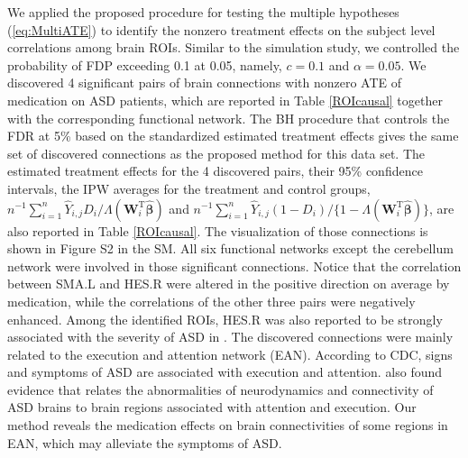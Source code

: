 \documentclass[12pt]{article}
\def\T{{ \mathrm{\scriptscriptstyle T} }}
\theoremstyle{definition}
\newcommand{\bW}{{\mathbf W}}
\newcommand{\bbeta}  {\boldsymbol{\beta}}
\begin{document}
We applied the proposed procedure for testing the multiple hypotheses (\ref{eq:MultiATE}) to identify the nonzero treatment effects on the subject level correlations among brain ROIs. Similar to the simulation study, we controlled the probability of FDP exceeding 0.1 at 0.05, namely, $c = 0.1$ and $\alpha = 0.05$. 
We discovered 4 significant pairs of brain connections 
with nonzero ATE of medication on ASD patients, which are reported in Table \ref{ROIcausal} together with the corresponding functional network. 
The BH procedure that controls the FDR at 5\% based on the standardized estimated treatment effects gives the same set of discovered connections as the proposed method for this data set.
The estimated treatment effects for the 4 discovered pairs, their 95\% confidence intervals, the IPW averages for the treatment and control groups, $n^{-1}\sum_{i = 1}^{n} {\hat{Y}_{i, j}D_{i}} / {\Lambda(\bW_{i}^{\T}\hat{\bbeta})}$ and
$n^{-1}\sum_{i = 1}^{n} {\hat{Y}_{i, j}(1 - D_{i})} / \{1 - \Lambda(\bW_{i}^{\T}\hat{\bbeta})\}$, are also reported in Table \ref{ROIcausal}.
The visualization of those connections is shown in Figure S2 in the SM. 
All six functional networks except the cerebellum network were involved in those significant connections. 
Notice that the correlation between SMA.L and HES.R were altered in the positive direction on average by medication, while the correlations of the other three pairs were negatively enhanced. 
Among the identified ROIs, HES.R was also reported to be strongly associated with the severity of ASD in \cite{liu2020alterations}.
The discovered connections were mainly related to the execution and attention network (EAN). According to CDC, signs and symptoms of ASD 
are associated with execution and attention.
\cite{bernas2018brain, snyder2020behavioural} also found evidence that relates the abnormalities of neurodynamics and connectivity of ASD brains to brain regions associated with attention and execution.
Our method reveals the medication effects on brain connectivities of some regions in EAN, which may alleviate the symptoms of ASD.
\end{document}
